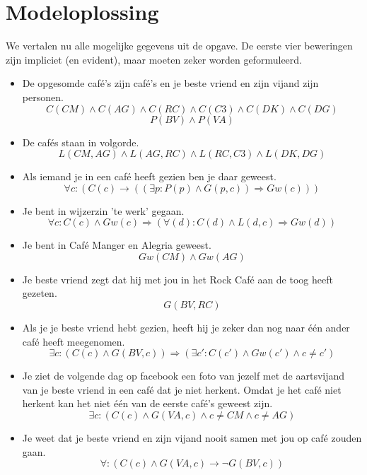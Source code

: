 \documentclass[alternative-exam.tex]{subfiles}
\begin{document}
\section{Modeloplossing}
We vertalen nu alle mogelijke gegevens uit de opgave. De eerste vier beweringen zijn impliciet (en evident), maar moeten zeker worden geformuleerd.
\begin{itemize}
\item De opgesomde caf\'e's zijn caf\'e's en je beste vriend en zijn vijand zijn personen.
\[ C(CM)\wedge C(AG)\wedge C(RC)\wedge C(C3)\wedge C(DK)\wedge C(DG) \]
\[ P(BV) \wedge P(VA)\]
\item De caf\'es staan in volgorde.
\[
L(CM,AG) \wedge L(AG,RC) \wedge L(RC,C3) \wedge L(DK,DG) 
\]
\item Als iemand je in een caf\'e heeft gezien ben je daar geweest.
\[
\forall c: (C(c) \rightarrow ((\exists p : P(p) \wedge G(p,c)) \Rightarrow Gw(c)))
\]
\item Je bent in wijzerzin 'te werk' gegaan.
\[
\forall c: C(c) \wedge Gw(c) \Rightarrow (\forall(d): C(d) \wedge L(d,c) \Rightarrow Gw(d))
\]
\item Je bent in Caf\'e Manger en Alegria geweest.
\[
Gw(CM) \wedge Gw(AG)
\]
\item Je beste vriend zegt dat hij met jou in het Rock Caf\'e aan de toog heeft gezeten.
\[
G(BV,RC)
\]
\item Als je je beste vriend hebt gezien, heeft hij je zeker dan nog naar \'e\'en ander caf\'e heeft meegenomen.
\[
\exists c: (C(c) \wedge G(BV,c)) \Rightarrow (\exists c': C(c') \wedge Gw(c') \wedge c \neq c')
\]
\item Je ziet de volgende dag op facebook een foto van jezelf met de aartsvijand van je beste vriend in een caf\'e dat je niet herkent. Omdat je het caf\'e niet herkent kan het niet \'e\'en van de eerste caf\'e's geweest zijn. 
\[
\exists c: (C(c) \wedge G(VA,c) \wedge c\neq CM \wedge c \neq AG)
\]
\item Je weet dat je beste vriend en zijn vijand nooit samen met jou op caf\'e zouden gaan.
\[
\forall : (C(c) \wedge G(VA,c) \rightarrow \neg G(BV,c))
\]

\end{itemize}
\end{document}
